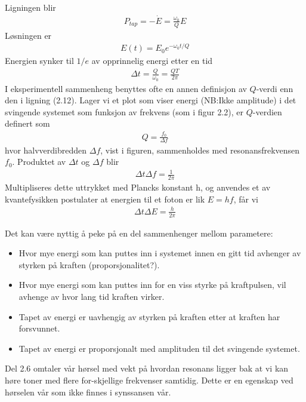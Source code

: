 \documentclass[12pt]{article}
\numberwithin{equation}{section}
\numberwithin{figure}{section}
\newcommand{\equ}[1]{{\small\begin{align*}#1\end{align*}}}
\newcommand{\ma}[1]{$#1$}
\newcommand{\eq}[1]{{\small\begin{align}#1\end{align}}}
\begin{document}
\begin{tcolorbox}[title = Del 2.3 -- Kvalitetsfaktoren \ma Q,breakable]
Ligningen blir
\equ{P_{tap} = -\dot E = \frac{\omega_0}{Q} E}
\tcbline
Løsningen er
\equ{E(t) = E_0 e^{-\omega_0t/Q}}
Energien synker til \ma{1/e} av opprinnelig energi etter en tid
\eq{\Delta t = \frac{Q}{\omega_0}
= \frac{QT}{2\pi}}
\tcbline
I eksperimentell sammenheng benyttes ofte en annen definisjon av \ma Q-verdi enn den i
ligning (2.12). Lager vi et plot som viser energi (NB:Ikke amplitude) 
i det svingende systemet som
funksjon av frekvens (som i figur 2.2), er \ma Q-verdien definert som
\eq{Q = \frac{f_0}{\Delta f}}
hvor halvverdibredden \ma{\Delta f}, vist i figuren, sammenholdes med resonansfrekvensen \ma{f_0}.
\tcbline
Produktet av \ma{\Delta t} og \ma{\Delta f} blir
\eq{\Delta t \Delta f = \frac{1}{2\pi}}
\tcbline
Multipliseres dette uttrykket med Plancks konstant h, og anvendes et av kvantefysikken postulater at
energien til et foton er lik \ma{E = hf}, får vi
\eq{\Delta t \Delta E = \frac{h}{2\pi}}
\end{tcolorbox}

\newpage
\begin{tcolorbox}[title = Del 2.4 -- Tidsbegrenset tvunget svingning,breakable]
Det kan være nyttig å peke på en del sammenhenger mellom parametere:
\begin{itemize}
\item Hvor mye energi som kan puttes inn i systemet innen en gitt tid avhenger av styrken
på kraften (proporsjonalitet?).
\item Hvor mye energi som kan puttes inn for en viss styrke på kraftpulsen, vil avhenge av
hvor lang tid kraften virker.
\item Tapet av energi er uavhengig av styrken på kraften etter at kraften har forsvunnet.
\item Tapet av energi er proporsjonalt med amplituden til det svingende systemet.
\end{itemize}
\end{tcolorbox}

Del 2.6 omtaler vår hørsel med vekt på hvordan resonans ligger bak at vi kan høre toner med flere for-skjellige frekvenser samtidig. Dette er en egenskap ved hørselen vår som ikke finnes i synssansen vår.
\setcounter{section}{3}
\newpage
\end{document}
